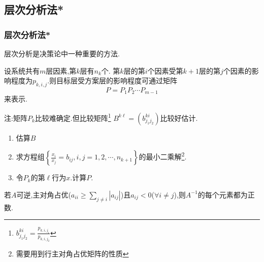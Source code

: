\subsection{层次分析法*}
\begin{frame}\frametitle{层次分析法*}
    层次分析是决策论中一种重要的方法.

    设系统共有$m$层因素,第$k$层有$n_k$个. 第$k$层的第$i$个因素受第$k+1$层的第$j$个因素的影响程度为$p_{k,i,j}$.则目标层受方案层的影响程度可通过矩阵
    \[P = P_1P_2\cdots P_{m-1}\]
    来表示.

    注:矩阵$P_k$比较难确定.但比较矩阵\footnote{$b^{ki}_{j_1j_2}=\frac{p_{k,i,j_1}}{p_{k,i,j_2}}$} $B^{k\ell}=(b^{ki}_{j_1j_2})$比较好估计.

    \begin{enumerate}
    \item 估算$B$
    \item 求方程组$\left\{\frac{x_i}{x_j}=b_{ij},i,j=1,2,\cdots,n_{k+1}\right\}$的最小二乘解\footnote{需要用到行主对角占优矩阵的性质}.
    \item 令$P_k$的第$\ell$行为$x$.计算$P$.
    \end{enumerate}
    \begin{theorem}
    若$A$可逆,主对角占优($a_{ii}\geq\sum_{j\neq i}|a_{ij}|$)且$a_{ij}<0$($\forall i\neq j$),则$A^{-1}$的每个元素都为正数.
    \end{theorem}
    \end{frame}









